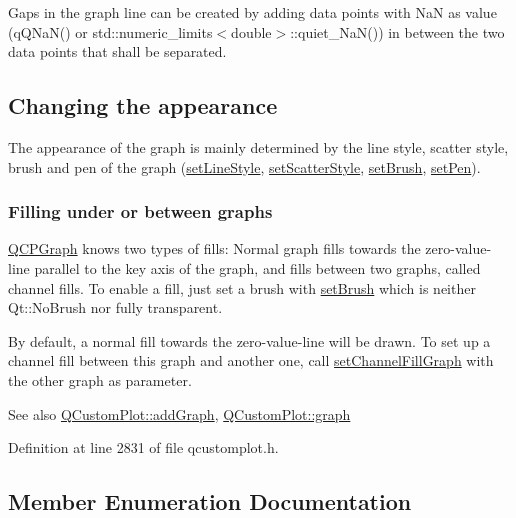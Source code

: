 Gaps in the graph line can be created by adding data points with Na\+N as value ({\ttfamily q\+Q\+Na\+N()} or {\ttfamily std\+::numeric\+\_\+limits$<$double$>$\+::quiet\+\_\+\+Na\+N()}) in between the two data points that shall be separated.\hypertarget{class_q_c_p_statistical_box_appearance}{}\subsection{Changing the appearance}\label{class_q_c_p_statistical_box_appearance}
The appearance of the graph is mainly determined by the line style, scatter style, brush and pen of the graph (\hyperlink{class_q_c_p_graph_a513fecccff5b2a50ce53f665338c60ff}{set\+Line\+Style}, \hyperlink{class_q_c_p_graph_a12bd17a8ba21983163ec5d8f42a9fea5}{set\+Scatter\+Style}, \hyperlink{class_q_c_p_abstract_plottable_a7a4b92144dca6453a1f0f210e27edc74}{set\+Brush}, \hyperlink{class_q_c_p_abstract_plottable_ab74b09ae4c0e7e13142fe4b5bf46cac7}{set\+Pen}).\hypertarget{class_q_c_p_graph_filling}{}\subsubsection{Filling under or between graphs}\label{class_q_c_p_graph_filling}
\hyperlink{class_q_c_p_graph}{Q\+C\+P\+Graph} knows two types of fills\+: Normal graph fills towards the zero-\/value-\/line parallel to the key axis of the graph, and fills between two graphs, called channel fills. To enable a fill, just set a brush with \hyperlink{class_q_c_p_abstract_plottable_a7a4b92144dca6453a1f0f210e27edc74}{set\+Brush} which is neither Qt\+::\+No\+Brush nor fully transparent.

By default, a normal fill towards the zero-\/value-\/line will be drawn. To set up a channel fill between this graph and another one, call \hyperlink{class_q_c_p_graph_a2d03156df1b64037a2e36cfa50351ca3}{set\+Channel\+Fill\+Graph} with the other graph as parameter.

\begin{DoxySeeAlso}{See also}
\hyperlink{class_q_custom_plot_a6fb2873d35a8a8089842d81a70a54167}{Q\+Custom\+Plot\+::add\+Graph}, \hyperlink{class_q_custom_plot_a6d3ed93c2bf46ab7fa670d66be4cddaf}{Q\+Custom\+Plot\+::graph} 
\end{DoxySeeAlso}


Definition at line 2831 of file qcustomplot.\+h.



\subsection{Member Enumeration Documentation}
\hypertarget{class_q_c_p_graph_ad23b514404bd2cb3216f57c90904d6af}{}
